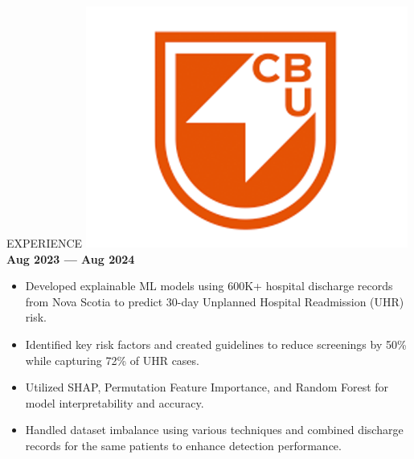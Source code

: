 \documentclass{resume}
\begin{document}
\vspace{-0.07cm}
\begin{rSection}{EXPERIENCE}
\includegraphics[height=3\fontcharht\font`\B]{cbu_logo.png}%
 \hfill \textbf{Aug 2023 --- Aug 2024}\vspace{-0.2cm}
\begin{itemize}
    \item Developed explainable ML models using 600K+ hospital discharge records from Nova Scotia to predict 30-day Unplanned Hospital Readmission (UHR) risk. \vspace{-0.22cm}
    \item Identified key risk factors and created guidelines to reduce screenings by 50\% while capturing 72\% of UHR cases.\vspace{-0.22cm}
    \item Utilized SHAP, Permutation Feature Importance, and Random Forest for model interpretability and accuracy.\vspace{-0.22cm}
    \item Handled dataset imbalance using various techniques and combined discharge records for the same patients to
    enhance detection performance.
\end{itemize}




\end{rSection}
\end{document}
